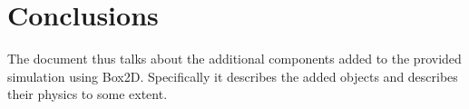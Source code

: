 \documentclass{article}
\begin{document}
\section{Conclusions}
\hspace{1 cm}
The document thus talks about the additional components added to the provided simulation using Box2D. Specifically it describes the added objects and describes their physics to some extent.
 


\end{document}
